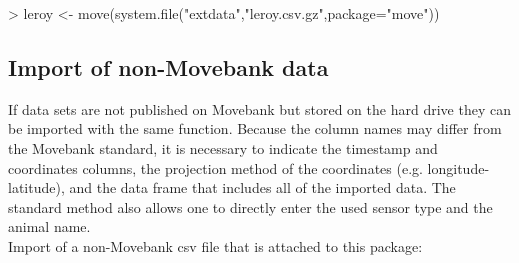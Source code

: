 \documentclass[article,nojss]{jss}
\newcommand{\fct}[1]{{\code{#1()}}}
\begin{document}
\begin{Schunk}
\begin{Sinput}
> leroy <- move(system.file("extdata","leroy.csv.gz",package="move"))
\end{Sinput}
\end{Schunk}

\subsection{Import of non-Movebank data}
If data sets are not published on Movebank but stored on the hard drive they can be imported with the same \fct{move} function. Because the column names may differ from the Movebank standard, it is necessary to indicate the timestamp and coordinates columns, the projection method of the coordinates (e.g. longitude-latitude), and the data frame that includes all of the imported data. The standard \fct{move} method also allows one to directly enter the used sensor type and the animal name. \\
Import of a non-Movebank csv file that is attached to this package:
\end{document}
